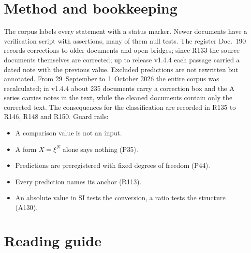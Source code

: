 \section{Method and bookkeeping}

The corpus labels every statement with a status marker. Newer documents have a verification
script with assertions, many of them null tests. The register Doc.~190 records corrections to
older documents and open bridges; since R133 the source documents themselves are corrected; up to release v1.4.4 each
passage carried a dated note with the previous value. Excluded predictions are not rewritten but
annotated. From 29~September to 1~October 2026 the entire corpus was recalculated; in v1.4.4 about 235
documents carry a correction box and the A series carries notes in the text, while the cleaned
documents contain only the corrected text. The consequences for the classification are recorded
in R135 to R146, R148 and R150. Guard rails:
\begin{itemize}[leftmargin=*,itemsep=1pt]
\item A comparison value is not an input.
\item A form $X=\xi^N$ alone says nothing (P35).
\item Predictions are preregistered with fixed degrees of freedom (P44).
\item Every prediction names its anchor (R113).
\item An absolute value in SI tests the conversion, a ratio tests the structure (A130).
\end{itemize}

\section{Reading guide}

